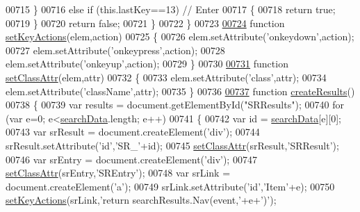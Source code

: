 \begin{DoxyCode}
00715       \}
00716       \textcolor{keywordflow}{else} \textcolor{keywordflow}{if} (this.lastKey==13) \textcolor{comment}{// Enter}
00717       \{
00718         \textcolor{keywordflow}{return} \textcolor{keyword}{true};
00719       \}
00720       \textcolor{keywordflow}{return} \textcolor{keyword}{false};
00721     \}
00722 \}
00723 
\hypertarget{search_8js_source_l00724}{}\hyperlink{search_8js_a98192fa2929bb8e4b0a890a4909ab9b2}{00724} \textcolor{keyword}{function} \hyperlink{search_8js_a98192fa2929bb8e4b0a890a4909ab9b2}{setKeyActions}(elem,action)
00725 \{
00726   elem.setAttribute(\textcolor{stringliteral}{'onkeydown'},action);
00727   elem.setAttribute(\textcolor{stringliteral}{'onkeypress'},action);
00728   elem.setAttribute(\textcolor{stringliteral}{'onkeyup'},action);
00729 \}
00730 
\hypertarget{search_8js_source_l00731}{}\hyperlink{search_8js_a499422fc054a5278ae32801ec0082c56}{00731} \textcolor{keyword}{function} \hyperlink{search_8js_a499422fc054a5278ae32801ec0082c56}{setClassAttr}(elem,attr)
00732 \{
00733   elem.setAttribute(\textcolor{stringliteral}{'class'},attr);
00734   elem.setAttribute(\textcolor{stringliteral}{'className'},attr);
00735 \}
00736 
\hypertarget{search_8js_source_l00737}{}\hyperlink{search_8js_a6b2c651120de3ed1dcf0d85341d51895}{00737} \textcolor{keyword}{function} \hyperlink{search_8js_a6b2c651120de3ed1dcf0d85341d51895}{createResults}()
00738 \{
00739   var results = document.getElementById(\textcolor{stringliteral}{"SRResults"});
00740   \textcolor{keywordflow}{for} (var e=0; e<\hyperlink{all__0_8js_ad01a7523f103d6242ef9b0451861231e}{searchData}.length; e++)
00741   \{
00742     var \textcolor{keywordtype}{id} = \hyperlink{all__0_8js_ad01a7523f103d6242ef9b0451861231e}{searchData}[e][0];
00743     var srResult = document.createElement(\textcolor{stringliteral}{'div'});
00744     srResult.setAttribute(\textcolor{stringliteral}{'id'},\textcolor{stringliteral}{'SR\_'}+\textcolor{keywordtype}{id});
00745     \hyperlink{search_8js_a499422fc054a5278ae32801ec0082c56}{setClassAttr}(srResult,\textcolor{stringliteral}{'SRResult'});
00746     var srEntry = document.createElement(\textcolor{stringliteral}{'div'});
00747     \hyperlink{search_8js_a499422fc054a5278ae32801ec0082c56}{setClassAttr}(srEntry,\textcolor{stringliteral}{'SREntry'});
00748     var srLink = document.createElement(\textcolor{charliteral}{'a'});
00749     srLink.setAttribute(\textcolor{stringliteral}{'id'},\textcolor{stringliteral}{'Item'}+e);
00750     \hyperlink{search_8js_a98192fa2929bb8e4b0a890a4909ab9b2}{setKeyActions}(srLink,\textcolor{stringliteral}{'return searchResults.Nav(event,'}+e+\textcolor{charliteral}{')'});

\end{DoxyCode}
